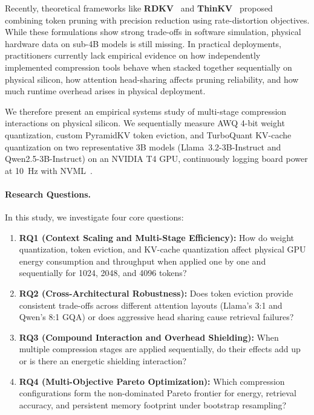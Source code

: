 \documentclass[sigconf,nonacm]{acmart}
\begin{document}
\begingroup\raggedright
Recently, theoretical frameworks like \textbf{RDKV}~\cite{zhang_rdkv_2026} and \textbf{ThinKV}~\cite{ramachandran_thinkv_2026} proposed combining token pruning with precision reduction using rate-distortion objectives. While these formulations show strong trade-offs in software simulation, physical hardware data on sub-4B models is still missing. In practical deployments, practitioners currently lack empirical evidence on how independently implemented compression tools behave when stacked together sequentially on physical silicon, how attention head-sharing affects pruning reliability, and how much runtime overhead arises in physical deployment.
\par\endgroup

We therefore present an empirical systems study of multi-stage compression interactions on physical silicon. We sequentially measure AWQ 4-bit weight quantization, custom PyramidKV token eviction, and TurboQuant KV-cache quantization on two representative 3B models (Llama~3.2-3B-Instruct and Qwen2.5-3B-Instruct) on an NVIDIA T4 GPU, continuously logging board power at 10~Hz with NVML~\cite{argerich_watt_2026,nvidia2024nvml}.

\paragraph{Research Questions.}
In this study, we investigate four core questions:
\begin{enumerate}\raggedright
  \item \textbf{RQ1 (Context Scaling and Multi-Stage Efficiency):} How do weight quantization, token eviction, and KV-cache quantization affect physical GPU energy consumption and throughput when applied one by one and sequentially for 1024, 2048, and 4096 tokens?
  \item \textbf{RQ2 (Cross-Architectural Robustness):} Does token eviction provide consistent trade-offs across different attention layouts (Llama's 3:1 and Qwen's 8:1 GQA) or does aggressive head sharing cause retrieval failures?
  \item \textbf{RQ3 (Compound Interaction and Overhead Shielding):} When multiple compression stages are applied sequentially, do their effects add up or is there an energetic shielding interaction?
  \item \textbf{RQ4 (Multi-Objective Pareto Optimization):} Which compression configurations form the non-dominated Pareto frontier for energy, retrieval accuracy, and persistent memory footprint under bootstrap resampling?
\end{enumerate}
\end{document}
